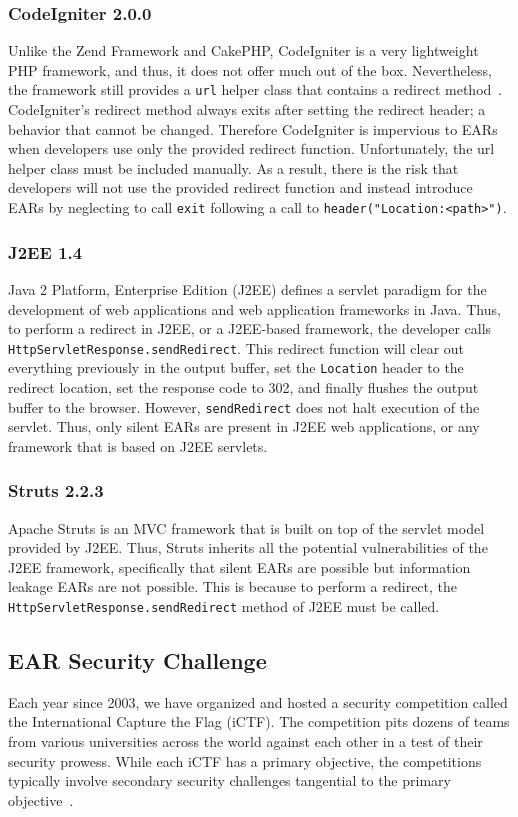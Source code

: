 \subsubsection{CodeIgniter 2.0.0}
Unlike the Zend Framework and CakePHP, CodeIgniter is a very lightweight PHP
framework, and thus, it does not offer much out of the box. Nevertheless, the
framework still provides a \texttt{url} helper class that contains a redirect
method~\cite{codeigniter-url}. CodeIgniter's redirect method always exits after
setting the redirect header; a behavior that cannot be changed. Therefore
CodeIgniter is impervious to EARs when developers use only the provided
redirect function. Unfortunately, the url helper class must be included
manually. As a result, there is the risk that developers will not use the
provided redirect function and instead introduce EARs by neglecting to call
\texttt{exit} following a call to \texttt{header("Location:<path>")}.

\subsubsection{J2EE 1.4}
Java 2 Platform, Enterprise Edition (J2EE) defines a serv\-let paradigm for
the development of web applications and web application frameworks in Java.
Thus, to perform a redirect in J2EE, or a J2EE-based framework, the
developer calls \texttt{HttpServletResponse.sendRedirect}. This redirect
function will clear out everything previously in the output buffer, set the
\texttt{Location} header to the redirect location, set the response code to
302, and finally flushes the output buffer to the browser. However,
\texttt{sendRedirect} does not halt execution of the servlet. Thus, only
silent EARs are present in J2EE web applications, or any framework that is
based on J2EE servlets.

\subsubsection{Struts 2.2.3}
Apache Struts is an MVC framework that is built on top of the servlet model
provided by J2EE. Thus, Struts inherits all the potential vulnerabilities
of the J2EE framework, specifically that silent EARs are possible but
information leakage EARs are not possible. This is because to perform a
redirect, the \texttt{HttpServletResponse.sendRedirect} method of J2EE must
be called.

\subsection{EAR Security Challenge}
Each year since 2003, we have organized and hosted a security competition
called the International Capture the Flag (iCTF). The competition pits
dozens of teams from various universities across the world against each
other in a test of their security prowess. While each iCTF has a primary
objective, the competitions typically involve secondary security challenges
tangential to the primary
objective~\cite{childers10:ictf}.


